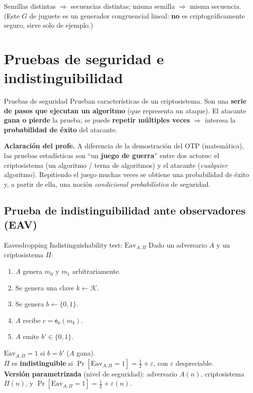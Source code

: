 \documentclass[11pt,a4paper]{article}
\newcommand{\Kset}{\mathcal{K}}
\newcommand{\E}{\mathsf{e}}
\newcommand{\bits}{\{0,1\}}
\begin{document}
\medskip
Semillas distintas $\Rightarrow$ secuencias distintas; misma semilla $\Rightarrow$ misma
secuencia. (Este $G$ de juguete es un generador congruencial lineal: \textbf{no} es
criptográficamente seguro, sirve solo de ejemplo.)

\section{Pruebas de seguridad e indistinguibilidad}

\begin{defbox}{Pruebas de seguridad}
Prueban características de un criptosistema. Son una \textbf{serie de pasos que ejecutan un
algoritmo} (que representa un ataque). El atacante \textbf{gana o pierde} la prueba; se
puede \textbf{repetir múltiples veces} $\Rightarrow$ interesa la \textbf{probabilidad de
éxito} del atacante.
\end{defbox}

\begin{slidebox}
\textbf{Aclaración del profe.} A diferencia de la demostración del OTP (matemática), las
pruebas estadísticas son ``un \textbf{juego de guerra}'' entre dos actores: el
criptosistema (un algoritmo / terna de algoritmos) y el atacante (\emph{cualquier}
algoritmo). Repitiendo el juego muchas veces se obtiene una probabilidad de éxito y, a
partir de ella, una noción \emph{condicional probabilística} de seguridad.
\end{slidebox}

\subsection{Prueba de indistinguibilidad ante observadores (EAV)}

\begin{defbox}{Eavesdropping Indistinguishability test: $\mathrm{Eav}_{A,\Pi}$}
Dado un adversario $A$ y un criptosistema $\Pi$:
\begin{enumerate}[leftmargin=1.6em,itemsep=2pt]
  \item $A$ genera $m_0$ y $m_1$ arbitrariamente.
  \item Se genera una clave $k\leftarrow\Kset$.
  \item Se genera $b\leftarrow\bits$.
  \item $A$ recibe $c=\E_k(m_b)$.
  \item $A$ emite $b'\in\bits$.
\end{enumerate}
$\mathrm{Eav}_{A,\Pi}=1$ si $b=b'$ ($A$ gana).\\[3pt]
$\Pi$ es \textbf{indistinguible} si\quad
$\Pr[\mathrm{Eav}_{A,\Pi}=1] = \tfrac12 + \varepsilon$, con $\varepsilon$ despreciable.\\[3pt]
\textbf{Versión parametrizada} (nivel de seguridad): adversario $A(n)$, criptosistema
$\Pi(n)$, y $\Pr[\mathrm{Eav}_{A,\Pi}=1]=\tfrac12+\varepsilon(n)$.
\end{defbox}
\end{document}
